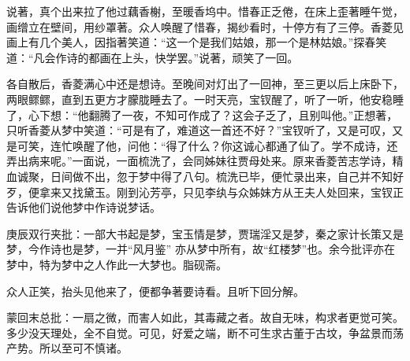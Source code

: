 \begin{parag}


    说著，真个出来拉了他过藕香榭，至暖香坞中。惜春正乏倦，在床上歪著睡午觉，画缯立在壁间，用纱罩著。众人唤醒了惜春，揭纱看时，十停方有了三停。香菱见画上有几个美人，因指著笑道：“这一个是我们姑娘，那一个是林姑娘。”探春笑道：“凡会作诗的都画在上头，快学罢。”说著，顽笑了一回。
\end{parag}


\begin{parag}


    各自散后，香菱满心中还是想诗。至晚间对灯出了一回神，至三更以后上床卧下，两眼鳏鳏，直到五更方才朦胧睡去了。一时天亮，宝钗醒了，听了一听，他安稳睡了，心下想：“他翻腾了一夜，不知可作成了？这会子乏了，且别叫他。”正想著，只听香菱从梦中笑道：“可是有了，难道这一首还不好？”宝钗听了，又是可叹，又是可笑，连忙唤醒了他，问他：“得了什么？你这诚心都通了仙了。学不成诗，还弄出病来呢。”一面说，一面梳洗了，会同姊妹往贾母处来。原来香菱苦志学诗，精血诚聚，日间做不出，忽于梦中得了八句。梳洗已毕，便忙录出来，自己并不知好歹，便拿来又找黛玉。刚到沁芳亭，只见李纨与众姊妹方从王夫人处回来，宝钗正告诉他们说他梦中作诗说梦话。\begin{note}庚辰双行夹批：一部大书起是梦，宝玉情是梦，贾瑞淫又是梦，秦之家计长策又是梦，今作诗也是梦，一并“风月鉴” 亦从梦中所有，故“红楼梦”也。余今批评亦在梦中，特为梦中之人作此一大梦也。脂砚斋。\end{note}众人正笑，抬头见他来了，便都争著要诗看。且听下回分解。
\end{parag}

\begin{parag}

    \begin{note}蒙回末总批：一扇之微，而害人如此，其毒藏之者。故自无味，构求者更觉可笑。多少没天理处，全不自觉。可见，好爱之端，断不可生求古董于古坟，争盆景而荡产势。所以至可不慎诸。\end{note}
\end{parag}

